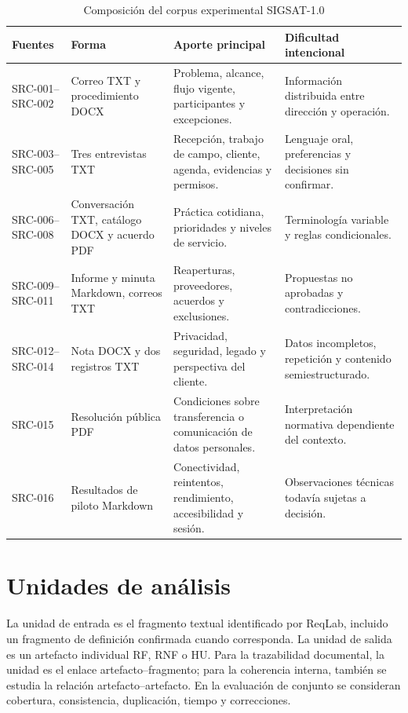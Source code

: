 \begin{table}[H]
  \centering
  \caption{Composición del corpus experimental SIGSAT-1.0}
  \label{tab:corpus-sigsat}
  \small
  \begin{tabularx}{\textwidth}{p{3.0cm}p{3.0cm}YY}
    \toprule
    Fuentes & Forma & Aporte principal & Dificultad intencional \\
    \midrule
    SRC-001--SRC-002 & Correo TXT y procedimiento DOCX & Problema, alcance, flujo vigente, participantes y excepciones. & Información distribuida entre dirección y operación. \\
    SRC-003--SRC-005 & Tres entrevistas TXT & Recepción, trabajo de campo, cliente, agenda, evidencias y permisos. & Lenguaje oral, preferencias y decisiones sin confirmar. \\
    SRC-006--SRC-008 & Conversación TXT, catálogo DOCX y acuerdo PDF & Práctica cotidiana, prioridades y niveles de servicio. & Terminología variable y reglas condicionales. \\
    SRC-009--SRC-011 & Informe y minuta Markdown, correos TXT & Reaperturas, proveedores, acuerdos y exclusiones. & Propuestas no aprobadas y contradicciones. \\
    SRC-012--SRC-014 & Nota DOCX y dos registros TXT & Privacidad, seguridad, legado y perspectiva del cliente. & Datos incompletos, repetición y contenido semiestructurado. \\
    SRC-015 & Resolución pública PDF & Condiciones sobre transferencia o comunicación de datos personales. & Interpretación normativa dependiente del contexto. \\
    SRC-016 & Resultados de piloto Markdown & Conectividad, reintentos, rendimiento, accesibilidad y sesión. & Observaciones técnicas todavía sujetas a decisión. \\
    \bottomrule
  \end{tabularx}
\end{table}

\section{Unidades de análisis}

La unidad de entrada es el fragmento textual identificado por ReqLab, incluido un fragmento de definición confirmada cuando corresponda. La unidad de salida es un artefacto individual RF, RNF o HU. Para la trazabilidad documental, la unidad es el enlace artefacto--fragmento; para la coherencia interna, también se estudia la relación artefacto--artefacto. En la evaluación de conjunto se consideran cobertura, consistencia, duplicación, tiempo y correcciones.

